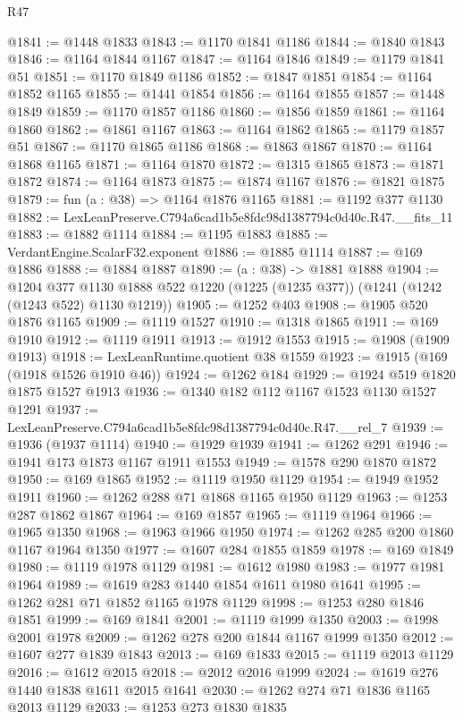\begin{lexlean}{R47}
\begin{coremodule}
@1841 := @1448 @1833
@1843 := @1170 @1841 @1186
@1844 := @1840 @1843
@1846 := @1164 @1844 @1167
@1847 := @1164 @1846
@1849 := @1179 @1841 @51
@1851 := @1170 @1849 @1186
@1852 := @1847 @1851
@1854 := @1164 @1852 @1165
@1855 := @1441 @1854
@1856 := @1164 @1855
@1857 := @1448 @1849
@1859 := @1170 @1857 @1186
@1860 := @1856 @1859
@1861 := @1164 @1860
@1862 := @1861 @1167
@1863 := @1164 @1862
@1865 := @1179 @1857 @51
@1867 := @1170 @1865 @1186
@1868 := @1863 @1867
@1870 := @1164 @1868 @1165
@1871 := @1164 @1870
@1872 := @1315 @1865
@1873 := @1871 @1872
@1874 := @1164 @1873
@1875 := @1874 @1167
@1876 := @1821 @1875
@1879 := fun (a : @38) => @1164 @1876 @1165
@1881 := @1192 @377 @1130
@1882 := LexLeanPreserve.C794a6cad1b5e8fdc98d1387794c0d40c.R47.__fits_11
@1883 := @1882 @1114
@1884 := @1195 @1883
@1885 := VerdantEngine.ScalarF32.exponent
@1886 := @1885 @1114
@1887 := @169 @1886
@1888 := @1884 @1887
@1890 := (a : @38) -> @1881 @1888
@1904 := @1204
    @377
    @1130
    @1888
    @522
    @1220
    (@1225 (@1235 @377))
    (@1241 (@1242 (@1243 @522) @1130 @1219))
@1905 := @1252 @403
@1908 := @1905 @520 @1876 @1165
@1909 := @1119 @1527
@1910 := @1318 @1865
@1911 := @169 @1910
@1912 := @1119 @1911
@1913 := @1912 @1553
@1915 := @1908 (@1909 @1913)
@1918 := LexLeanRuntime.quotient @38 @1559
@1923 := @1915 (@169 (@1918 @1526 @1910 @46))
@1924 := @1262 @184
@1929 := @1924 @519 @1820 @1875 @1527 @1913
@1936 := @1340 @182 @112 @1167 @1523 @1130 @1527 @1291
@1937 := LexLeanPreserve.C794a6cad1b5e8fdc98d1387794c0d40c.R47.__rel_7
@1939 := @1936 (@1937 @1114)
@1940 := @1929 @1939
@1941 := @1262 @291
@1946 := @1941 @173 @1873 @1167 @1911 @1553
@1949 := @1578 @290 @1870 @1872
@1950 := @169 @1865
@1952 := @1119 @1950 @1129
@1954 := @1949 @1952 @1911
@1960 := @1262 @288 @71 @1868 @1165 @1950 @1129
@1963 := @1253 @287 @1862 @1867
@1964 := @169 @1857
@1965 := @1119 @1964
@1966 := @1965 @1350
@1968 := @1963 @1966 @1950
@1974 := @1262 @285 @200 @1860 @1167 @1964 @1350
@1977 := @1607 @284 @1855 @1859
@1978 := @169 @1849
@1980 := @1119 @1978 @1129
@1981 := @1612 @1980
@1983 := @1977 @1981 @1964
@1989 := @1619 @283 @1440 @1854 @1611 @1980 @1641
@1995 := @1262 @281 @71 @1852 @1165 @1978 @1129
@1998 := @1253 @280 @1846 @1851
@1999 := @169 @1841
@2001 := @1119 @1999 @1350
@2003 := @1998 @2001 @1978
@2009 := @1262 @278 @200 @1844 @1167 @1999 @1350
@2012 := @1607 @277 @1839 @1843
@2013 := @169 @1833
@2015 := @1119 @2013 @1129
@2016 := @1612 @2015
@2018 := @2012 @2016 @1999
@2024 := @1619 @276 @1440 @1838 @1611 @2015 @1641
@2030 := @1262 @274 @71 @1836 @1165 @2013 @1129
@2033 := @1253 @273 @1830 @1835

\end{coremodule}
\end{lexlean}
